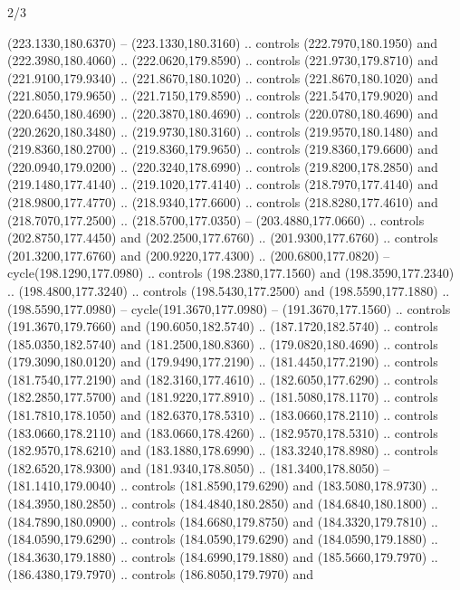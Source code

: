\begin{flagdescription}{2/3}
\begin{scope}[xshift=0.5\flaglength,yshift=0.5\flagwidth,scale=\flagwidth/259.2]
\begin{scope}[y=0.8pt, x=0.8pt, yscale=-1,shift={(-243,-162)}]
      (223.1330,180.6370) -- (223.1330,180.3160) .. controls (222.7970,180.1950) and
      (222.3980,180.4060) .. (222.0620,179.8590) .. controls (221.9730,179.8710) and
      (221.9100,179.9340) .. (221.8670,180.1020) .. controls (221.8670,180.1020) and
      (221.8050,179.9650) .. (221.7150,179.8590) .. controls (221.5470,179.9020) and
      (220.6450,180.4690) .. (220.3870,180.4690) .. controls (220.0780,180.4690) and
      (220.2620,180.3480) .. (219.9730,180.3160) .. controls (219.9570,180.1480) and
      (219.8360,180.2700) .. (219.8360,179.9650) .. controls (219.8360,179.6600) and
      (220.0940,179.0200) .. (220.3240,178.6990) .. controls (219.8200,178.2850) and
      (219.1480,177.4140) .. (219.1020,177.4140) .. controls (218.7970,177.4140) and
      (218.9800,177.4770) .. (218.9340,177.6600) .. controls (218.8280,177.4610) and
      (218.7070,177.2500) .. (218.5700,177.0350) -- (203.4880,177.0660) .. controls
      (202.8750,177.4450) and (202.2500,177.6760) .. (201.9300,177.6760) .. controls
      (201.3200,177.6760) and (200.9220,177.4300) .. (200.6800,177.0820) --
      cycle(198.1290,177.0980) .. controls (198.2380,177.1560) and
      (198.3590,177.2340) .. (198.4800,177.3240) .. controls (198.5430,177.2500) and
      (198.5590,177.1880) .. (198.5590,177.0980) -- cycle(191.3670,177.0980) --
      (191.3670,177.1560) .. controls (191.3670,179.7660) and (190.6050,182.5740) ..
      (187.1720,182.5740) .. controls (185.0350,182.5740) and (181.2500,180.8360) ..
      (179.0820,180.4690) .. controls (179.3090,180.0120) and (179.9490,177.2190) ..
      (181.4450,177.2190) .. controls (181.7540,177.2190) and (182.3160,177.4610) ..
      (182.6050,177.6290) .. controls (182.2850,177.5700) and (181.9220,177.8910) ..
      (181.5080,178.1170) .. controls (181.7810,178.1050) and (182.6370,178.5310) ..
      (183.0660,178.2110) .. controls (183.0660,178.2110) and (183.0660,178.4260) ..
      (182.9570,178.5310) .. controls (182.9570,178.6210) and (183.1880,178.6990) ..
      (183.3240,178.8980) .. controls (182.6520,178.9300) and (181.9340,178.8050) ..
      (181.3400,178.8050) -- (181.1410,179.0040) .. controls (181.8590,179.6290) and
      (183.5080,178.9730) .. (184.3950,180.2850) .. controls (184.4840,180.2850) and
      (184.6840,180.1800) .. (184.7890,180.0900) .. controls (184.6680,179.8750) and
      (184.3320,179.7810) .. (184.0590,179.6290) .. controls (184.0590,179.6290) and
      (184.0590,179.1880) .. (184.3630,179.1880) .. controls (184.6990,179.1880) and
      (185.5660,179.7970) .. (186.4380,179.7970) .. controls (186.8050,179.7970) and

\end{scope}
\end{scope}
\end{flagdescription}
